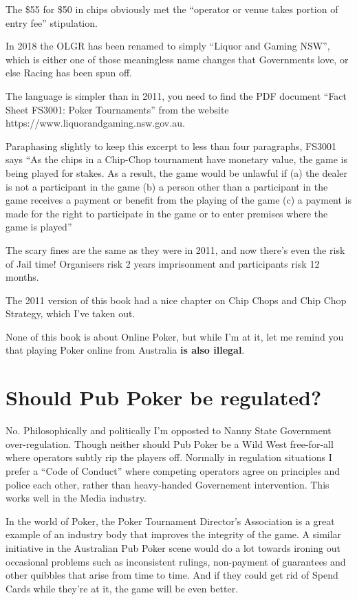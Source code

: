 
The \$55 for \$50 in chips obviously met the ``operator or venue takes
portion of entry fee'' stipulation.

In 2018 the OLGR has been renamed to simply 
``Liquor and Gaming NSW'', which is either one of those meaningless
name changes that Governments love, or else Racing has been spun off.

The language is simpler than in 2011, you need to find 
the PDF document ``Fact Sheet FS3001: Poker Tournaments'' from
the website https://www.liquorandgaming.nsw.gov.au. 

Paraphasing slightly to keep this excerpt to less than four paragraphs,
FS3001 says ``As the chips in a Chip-Chop tournament
have monetary value, the game is being played for stakes. As a result,
the game would be unlawful if (a) the dealer is not a participant in the game
(b) a person other than a participant in the game receives a payment
or benefit from the playing of the game (c) a payment is made for the
right to participate in the game or to enter premises where the game
is played''

The scary fines are the same as they were in 2011, and now there's even
the risk of Jail time! Organisers risk 2 years imprisonment and
participants risk 12 months.

The 2011 version of this book had a nice chapter on Chip Chops and
Chip Chop Strategy, which I've taken out. 

None of this book is about Online Poker, but while I'm at it,
let me remind you that playing Poker online from Australia
\textbf{is also illegal}. 

\section{Should Pub Poker be regulated?}

No. Philosophically and politically I'm opposted to Nanny State
Government over-regulation. Though neither should Pub Poker
be a Wild West free-for-all where operators subtly rip the players
off. Normally in regulation situations I prefer a ``Code of Conduct''
where competing operators agree on principles and police each other,
rather than heavy-handed Governement intervention. This works well
in the Media industry.

In the world of Poker, the Poker Tournament Director's Association
is a great example of an industry body that improves the integrity
of the game. A similar initiative in the Australian Pub Poker scene
would do a lot towards ironing out occasional problems such as
inconsistent rulings, non-payment of guarantees and other quibbles
that arise from time to time. And if they could get rid of Spend Cards
while they're at it, the game will be even better.


